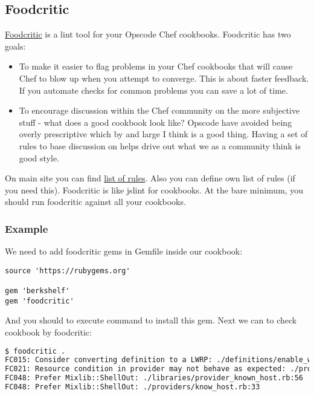 \subsection{Foodcritic}

\href{http://www.foodcritic.io/}{Foodcritic} is a lint tool for your Opscode Chef cookbooks. Foodcritic has two goals:

\begin{itemize}
  \item To make it easier to flag problems in your Chef cookbooks that will cause Chef to blow up when you attempt to converge. This is about faster feedback. If you automate checks for common problems you can save a lot of time.
  \item To encourage discussion within the Chef community on the more subjective stuff - what does a good cookbook look like? Opscode have avoided being overly prescriptive which by and large I think is a good thing. Having a set of rules to base discussion on helps drive out what we as a community think is good style.
\end{itemize}

On main site you can find \href{http://www.foodcritic.io/}{list of rules}. Also you can define own list of rules (if you need this). Foodcritic is like jslint for cookbooks. At the bare minimum, you should run foodcritic against all your cookbooks.

\subsubsection{Example}

We need to add foodcritic gems in Gemfile inside our  cookbook:

\begin{lstlisting}[label=lst:testing-foodcritic1]
source 'https://rubygems.org'

gem 'berkshelf'
gem 'foodcritic'
\end{lstlisting}

And you should to execute  command to install this gem. Next we can to check  cookbook by foodcritic:

\begin{lstlisting}[language=Bash,label=lst:testing-foodcritic2]
$ foodcritic .
FC015: Consider converting definition to a LWRP: ./definitions/enable_web_site.rb:1
FC021: Resource condition in provider may not behave as expected: ./providers/know_host.rb:39
FC048: Prefer Mixlib::ShellOut: ./libraries/provider_known_host.rb:56
FC048: Prefer Mixlib::ShellOut: ./providers/know_host.rb:33
\end{lstlisting}

